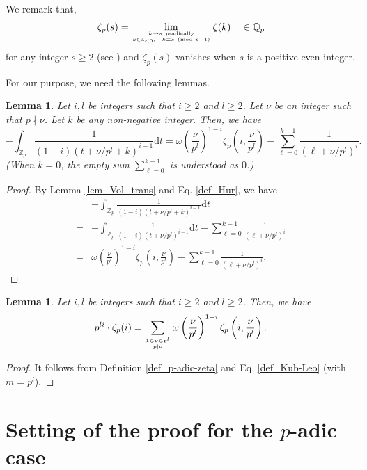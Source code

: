 \documentclass[12pt]{article}
\newtheorem{lemma}[theorem]{Lemma}
\numberwithin{equation}{section}
\begin{document}
We remark that, 
\[\zeta_p(s) = \lim_{k \rightarrow s ~p\text{-adically}\atop k \in \mathbb{Z}_{<0},~~ k\equiv s \pmod{p-1}} \zeta(k) \quad \in \mathbb{Q}_p\]
for any integer $s \geqslant 2$ (see \cite[Lemma 2.4]{Cal2005})
and $\zeta_p(s)$ vanishes when $s$ is a positive even integer.

\bigskip

For our purpose, we need the following lemmas.

\begin{lemma}\label{integral_of_shift}
Let $i,l$ be integers such that $i \geqslant 2$ and $l \geqslant 2$. Let $\nu$ be an integer such that $p \nmid \nu$. Let $k$ be any non-negative integer. Then, we have
\[  - \int_{\mathbb{Z}_p} \frac{1}{(1-i)(t+\nu/p^{l}+k)^{i-1}} \mathrm{d}t = \omega\left( \frac{\nu}{p^{l}} \right)^{1-i} \zeta_p\left(i, \frac{\nu}{p^l} \right)  - \sum_{\ell = 0}^{k-1} \frac{1}{(\ell+\nu/p^{l})^{i}}.  \]
(When $k=0$, the empty sum $\sum_{\ell=0}^{k-1}$ is understood as $0$.)
\end{lemma}

\begin{proof}
By Lemma \ref{lem_Vol_trans} and Eq. \eqref{def_Hur}, we have
\begin{align*}
&- \int_{\mathbb{Z}_p} \frac{1}{(1-i)(t+\nu/p^{l}+k)^{i-1}} \mathrm{d}t \\
=  &- \int_{\mathbb{Z}_p} \frac{1}{(1-i)(t+\nu/p^{l})^{i-1}} \mathrm{d}t  - \sum_{\ell = 0}^{k-1} \frac{1}{(\ell+\nu/p^{l})^{i}} \\
= &\omega\left( \frac{\nu}{p^{l}} \right)^{1-i} \zeta_p\left(i, \frac{\nu}{p^l} \right)  - \sum_{\ell = 0}^{k-1} \frac{1}{(\ell+\nu/p^{l})^{i}}.
\end{align*}
\end{proof}


\begin{lemma}\label{lem_Hur_to_zeta}
Let $i,l$ be integers such that $i \geqslant 2$ and $l \geqslant 2$. Then, we have
\[ p^{li} \cdot \zeta_p(i) = \sum_{1 \leqslant \nu \leqslant p^{l} \atop p \nmid \nu} \omega\left( \frac{\nu}{p^l} \right)^{1-i}
\zeta_p\left( i, \frac{\nu}{p^{l}} \right).  \]
\end{lemma}

\begin{proof}
It follows from Definition \ref{def_p-adic-zeta} and Eq. \eqref{def_Kub-Leo} (with $m=p^{l}$).
\end{proof}

\bigskip

\section{Setting of the proof for the $p$-adic case}\label{Sect_sett_p}
\end{document}

